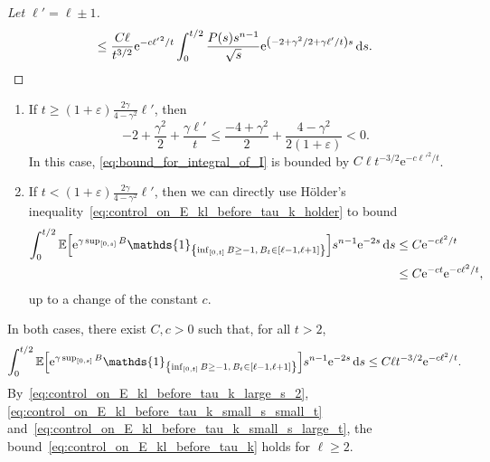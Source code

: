 \documentclass[AHL,Unicode,longabstracts,published]{cedram}
\newcommand{\e}{\mathrm{e}}
\renewcommand{\d}[1]{\mathop{}\!\mathrm{d}#1}
\newcommand{\E}{\mathbb{E}}
\newcommand\1{\mathds{1}}
\newcommand*{\relabel}{\renewcommand{\labelenumi}{(\theenumi)}}
\newcommand*{\romanenumi}{\renewcommand*{\theenumi}{\roman{enumi}}\relabel}
\let\originalleft\left
\let\originalright\right
\renewcommand{\left}{\mathopen{}\mathclose\bgroup\originalleft}
\renewcommand{\right}{\aftergroup\egroup\originalright}
\begin{document}
\begin{proofc}
\begin{proof}[{Let $\ell' = \ell \pm 1$}]
\begin{multline}
\leq \frac{C \ell}{t^{3/2}} \e^{-c {\ell'}^2/t} \int_0^{t/2} \frac{P(s) s^{n - 1}}{\sqrt{s}} \e^{\left(-2 + \gamma^2/2 + \gamma \ell'/t\right)s} \d{s}.
\end{multline}
\let\qed\relax
\end{proof}
\begin{proofc}
\begin{enumerate}\romanenumi
\item If $t \geq (1 + \varepsilon) \frac{2 \gamma}{4 - \gamma^2} \ell'$, then
\begin{equation*}
-2 + \frac{\gamma^2}{2} + \frac{\gamma \ell'}{t} \leq\frac{-4 + \gamma^2}{2} + \frac{4 - \gamma^2}{2 (1 + \varepsilon)} < 0.
\end{equation*}
In this case, \eqref{eq:bound_for_integral_of_I} is bounded by $C \ell t^{-3/2} \e^{-c {\ell'}^2/t}$.
\item If $t < (1 + \varepsilon) \frac{2 \gamma}{4 - \gamma^2} \ell'$, then we can directly use H\"older's inequality~\eqref{eq:control_on_E_kl_before_tau_k_holder} to bound
\begin{align*}
\int_0^{t/2} \E \left[\e^{\gamma \sup_{[0, s]} B} \1_{\left\{\inf_{[0, t]} B \geq -1,\, B_t \in [\ell-1, \ell+1]\right\}} \right] s^{n-1} \e^{-2s} \d{s} & \leq C \e^{-c\ell^2/t} \\
& \leq C \e^{-ct} \e^{-c\ell^2/t},
\end{align*}
up to a change of the constant $c$.
\end{enumerate}
In both cases, there exist $C, c > 0$ such that, for all $t > 2$,
\begin{equation}\label{eq:control_on_E_kl_before_tau_k_small_s_large_t}
\int_0^{t/2} \E \left[\e^{\gamma \sup_{[0, s]} B} \1_{\left\{\inf_{[0, t]} B \geq -1,\, B_t \in [\ell-1, \ell+1]\right\}} \right] s^{n-1} \e^{-2s} \d{s} \leq C \ell t^{-3/2} \e^{-c\ell^2/t}.
\end{equation}
By~\eqref{eq:control_on_E_kl_before_tau_k_large_s_2}, \eqref{eq:control_on_E_kl_before_tau_k_small_s_small_t} and~\eqref{eq:control_on_E_kl_before_tau_k_small_s_large_t}, the bound~\eqref{eq:control_on_E_kl_before_tau_k} holds for $\ell \geq 2$.\qedhere
\end{proofc}\let\qed\relax
\end{proofc}
\end{document}
